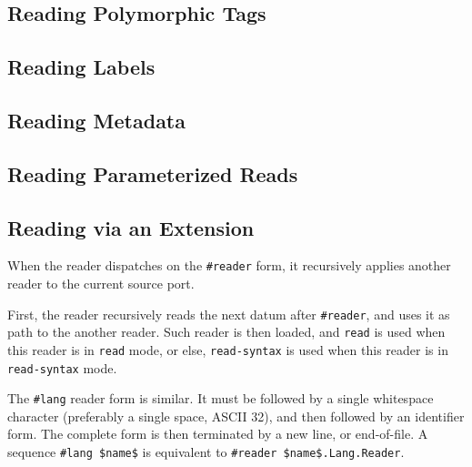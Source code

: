 \subsection{Reading Polymorphic Tags}
\label{subsec:aml-base-lang-reader-polytags}





\subsection{Reading Labels}
\label{subsec:aml-base-lang-reader-labels}





\subsection{Reading Metadata}
\label{subsec:aml-base-lang-reader-metadata}





\subsection{Reading Parameterized Reads}
\label{subsec:aml-base-lang-reader-parameterized-reads}





\subsection{Reading via an Extension}
\label{subsec:aml-base-lang-reader-extension}

When the reader dispatches on the \lstinline!#reader! form, it recursively applies another reader to the current source port. 


First, the reader recursively reads the next datum after \lstinline!#reader!, and uses it as path to the another reader. Such reader is then loaded, and \lstinline!read! is used when this reader is in \lstinline!read! mode, or else, \lstinline!read-syntax! is used when this reader is in \lstinline!read-syntax! mode.

The \lstinline!#lang! reader form is similar. It must be followed by a single whitespace character (preferably a single space, ASCII 32), and then followed by an identifier form. The complete form is then terminated by a new line, or end-of-file. A sequence \lstinline!#lang $name$! is equivalent to \lstinline!#reader $name$.Lang.Reader!. 

